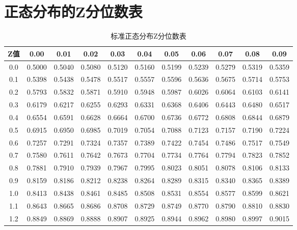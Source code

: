 \documentclass[12pt]{article}
\begin{document}
\section{正态分布的Z分位数表}
\begin{table}[H]
    \centering
        \caption{\small 标准正态分布Z分位数表}
        \label{tab:z_table_detailed}
        \begin{tabular}{|c|c|c|c|c|c|c|c|c|c|c|}
            \hline
            Z值 & 0.00 & 0.01 & 0.02 & 0.03 & 0.04 & 0.05 & 0.06 & 0.07 & 0.08 & 0.09 \\ \hline
            0.0 & 0.5000 & 0.5040 & 0.5080 & 0.5120 & 0.5160 & 0.5199 & 0.5239 & 0.5279 & 0.5319 & 0.5359 \\ \hline
            0.1 & 0.5398 & 0.5438 & 0.5478 & 0.5517 & 0.5557 & 0.5596 & 0.5636 & 0.5675 & 0.5714 & 0.5753 \\ \hline
            0.2 & 0.5793 & 0.5832 & 0.5871 & 0.5910 & 0.5948 & 0.5987 & 0.6026 & 0.6064 & 0.6103 & 0.6141 \\ \hline
            0.3 & 0.6179 & 0.6217 & 0.6255 & 0.6293 & 0.6331 & 0.6368 & 0.6406 & 0.6443 & 0.6480 & 0.6517 \\ \hline
            0.4 & 0.6554 & 0.6591 & 0.6628 & 0.6664 & 0.6700 & 0.6736 & 0.6772 & 0.6808 & 0.6844 & 0.6879 \\ \hline
            0.5 & 0.6915 & 0.6950 & 0.6985 & 0.7019 & 0.7054 & 0.7088 & 0.7123 & 0.7157 & 0.7190 & 0.7224 \\ \hline
            0.6 & 0.7257 & 0.7291 & 0.7324 & 0.7357 & 0.7389 & 0.7422 & 0.7454 & 0.7486 & 0.7517 & 0.7549 \\ \hline
            0.7 & 0.7580 & 0.7611 & 0.7642 & 0.7673 & 0.7704 & 0.7734 & 0.7764 & 0.7794 & 0.7823 & 0.7852 \\ \hline
            0.8 & 0.7881 & 0.7910 & 0.7939 & 0.7967 & 0.7995 & 0.8023 & 0.8051 & 0.8078 & 0.8106 & 0.8133 \\ \hline
            0.9 & 0.8159 & 0.8186 & 0.8212 & 0.8238 & 0.8264 & 0.8289 & 0.8315 & 0.8340 & 0.8365 & 0.8389 \\ \hline
            1.0 & 0.8413 & 0.8438 & 0.8461 & 0.8485 & 0.8508 & 0.8531 & 0.8554 & 0.8577 & 0.8599 & 0.8621 \\ \hline
            1.1 & 0.8643 & 0.8665 & 0.8686 & 0.8708 & 0.8729 & 0.8749 & 0.8770 & 0.8790 & 0.8810 & 0.8830 \\ \hline
            1.2 & 0.8849 & 0.8869 & 0.8888 & 0.8907 & 0.8925 & 0.8944 & 0.8962 & 0.8980 & 0.8997 & 0.9015 \\ \hline

\end{tabular}
\end{table}
\end{document}
